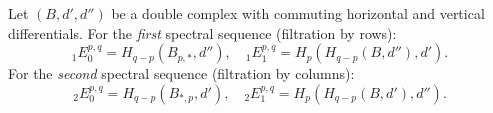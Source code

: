 Let $(B, d', d'')$ be a double complex with commuting horizontal and vertical differentials. For the \emph{first} spectral sequence (filtration by rows):
$${}_1E_0^{p,q} = H_{q-p}(B_{p,*}, d''), \quad {}_1E_1^{p,q} = H_p(H_{q-p}(B, d''), d').$$
For the \emph{second} spectral sequence (filtration by columns):
$${}_2E_0^{p,q} = H_{q-p}(B_{*,p}, d'), \quad {}_2E_1^{p,q} = H_p(H_{q-p}(B, d'), d'').$$